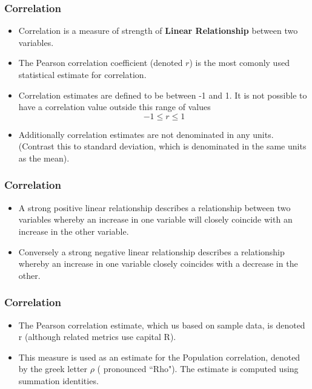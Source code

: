 \documentclass[a4]{beamer}
\begin{document}
\begin{frame}
\frametitle{Correlation}
\Large
\begin{itemize}
\item Correlation is a measure of strength of \textbf{Linear Relationship} between two variables.
\item The Pearson correlation coefficient (denoted $r$) is the most comonly used statistical estimate for correlation. 
\item Correlation estimates are defined to be between -1 and 1. It is not possible to have a correlation value outside this range of values
\[ -1 \leq r \leq 1\]
\item 
Additionally correlation estimates are not denominated in any units. (Contrast this to standard deviation, which is denominated in the same units as the mean).
\end{itemize}
\end{frame}

\begin{frame}
\frametitle{Correlation}
\Large
\begin{itemize}
\item A strong positive linear relationship describes a relationship between two variables whereby an increase in one variable will closely coincide with an increase in the other variable. 
\item Conversely a strong negative linear relationship describes a relationship whereby an increase in one variable closely coincides with a decrease in the other. 
\end{itemize}
\end{frame}



\begin{frame}
\frametitle{Correlation}
\Large
\begin{itemize}
\item The Pearson correlation estimate, which us based on sample data, is denoted r (although related metrics use capital R).
\item This measure is used as an estimate for the Population correlation, denoted by the greek letter $\rho$ ( pronounced ``Rho"). 
The estimate is computed using summation identities.
 
\end{itemize}
\end{frame}
\end{document}
